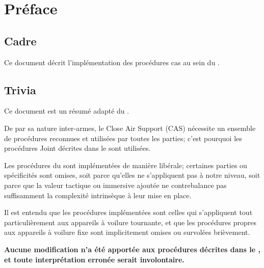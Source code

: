\thispagestyle{default}





\section*{Préface}
{}

\subsection*{Cadre}

\vfil

Ce document décrit l'implémentation des procédures \acrfull{cas} au sein du \rgt{}.

\vfil

\subsection*{Trivia}

\vfil

Ce document est un résumé adapté du \jp{}.

\vfil

De par sa nature inter-armes, le Close Air Support (CAS) nécessite un ensemble de procédures reconnues et utilisées par toutes les parties; c'est pourquoi les procédures Joint décrites dans le \jp{} sont utilisées.

\vfil

Les procédures du \jp{} sont implémentées de manière libérale; certaines parties ou spécificités sont omises, soit parce qu'elles ne s'appliquent pas à notre niveau, soit parce que la valeur tactique ou immersive ajoutée ne contrebalance pas suffisamment la complexité intrinsèque à leur mise en place.

\vfil

Il est entendu que les procédures implémentées sont celles qui s'appliquent tout particulièrement aux appareils à voilure tournante, et que les procédures propres aux appareils à voilure fixe sont implicitement omises ou survolées brièvement.

\vfil

\textbf{Aucune modification n'a été apportée aux procédures décrites dans le \jp{}, et toute interprétation erronée serait involontaire.}
